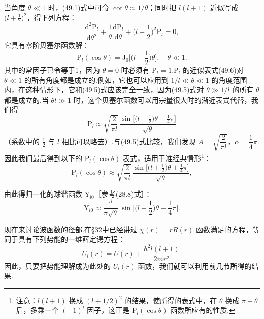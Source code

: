 当角度 $\theta\ll1$ 时，(49.1)式中可令 $\cot\theta\approx1/\theta$；同时把 $l(l+1)$ 近似写成 $\big(l+\frac{1}{2}\big)^2$，得下列方程：
\begin{equation*}
  \frac{\mathrm{d}^2\mathrm{P}_l}{\mathrm{d}\theta^2}
  +\frac{1}{\theta}\frac{\mathrm{d}\mathrm{P}_l}{\mathrm{d}\theta}
  +\bigg(l+\frac{1}{2}\bigg)^2\mathrm{P}_l=0,
\end{equation*}
它具有零阶贝塞尔函数解：
\begin{equation}
  \mathrm{P}_l(\cos\theta)=\mathrm{J}_0\bigg[\bigg(l+\frac{1}{2}\bigg)\theta\bigg],
  \quad\theta\ll1.
\end{equation}
其中的常因子已令等于1，因为 $\theta=0$ 时必须有 $\mathrm{P}_l=1$.$\mathrm{P}_l$ 的近似表式(49.6)对 $\theta\ll1$ 的所有角度都是成立的.例如，它也可以应用到 $1/l\ll\theta\ll1$ 的角度范围内，在这种情形下，它和(49.5)式应该完全一致，因为(49.5)式对 $\theta\gg1/l$ 的所有 $\theta$ 都是成立的.当 $\theta l\gg1$ 时，这个贝塞尔函数可以用宗量很大时的渐近表式代替，我们得
\begin{equation*}
  \mathrm{P}_l\approx\sqrt{\frac{2}{\pi l}}\,
  \frac{\sin\big[\big(l+\frac{1}{2}\big)\theta+\frac{1}{4}\pi\big]}{\sqrt{\theta}}
\end{equation*}
（系数中的 $\frac{1}{2}$ 与 $l$ 相比可以略去）.与(49.5)式比较，我们发现
$A=\sqrt{\dfrac{2}{\pi l}}$，$\alpha=\dfrac{1}{4}\pi$.因此我们最后得到以下的 $\mathrm{P}_l(\cos\theta)$ 表式，适用于准经典情形\footnote{注意：$l(l+1)$ 换成 $(l+1/2)^2$ 的结果，使所得的表式中，在 $\theta$ 换成 $\pi-\theta$ 后，多乘一个 $(-1)^l$ 因子，这正是 $\mathrm{P}_l(\cos\theta)$ 函数所应有的性质.}：
\begin{equation}
  \mathrm{P}_l(\cos\theta)\approx\sqrt{\frac{2}{\pi l}}\,
  \frac{\sin\big[\big(l+\frac{1}{2}\big)\theta+\frac{1}{4}\pi\big]}{\sqrt{\theta}},
\end{equation}

由此得归一化的球谐函数 $\mathrm{Y}_{l0}$［参考(28.8)式］：
\begin{equation}
  \mathrm{Y}_{l0}\approx\frac{\mathrm{i}^l}{\pi\sqrt{\theta}}\,
  \sin\bigg[\bigg(l+\frac{1}{2}\bigg)\theta+\frac{1}{4}\pi\bigg].
\end{equation}

现在来讨论波函数的径部.在§32中已经讲过 $\chi(r)=rR(r)$ 函数满足的方程，等同于具有下列势能的一维薛定谔方程：
\begin{equation*}
  U_l(r)=U(r)+\frac{\hbar^2l(l+1)}{2mr^2}.
\end{equation*}
因此，只要把势能理解成为此处的 $U_l(r)$ 函数，我们就可以利用前几节所得的结果.


